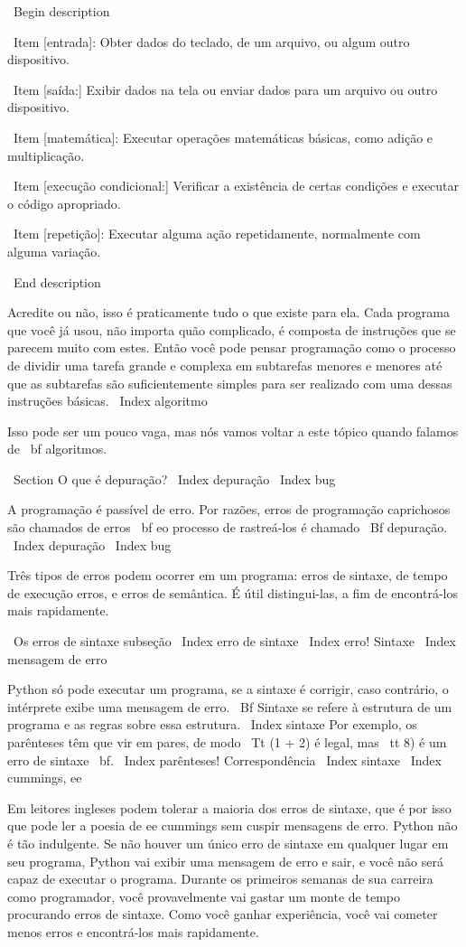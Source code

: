 \documentclass[10pt]{book}
\begin{document}
{\ Begin {description}

\ Item [entrada]: Obter dados do teclado, de um arquivo, ou algum
outro dispositivo.

\ Item [saída:] Exibir dados na tela ou enviar dados para um
arquivo ou outro dispositivo.

\ Item [matemática]: Executar operações matemáticas básicas, como adição e
multiplicação.

\ Item [execução condicional:] Verificar a existência de certas condições e
executar o código apropriado.

\ Item [repetição]: Executar alguma ação repetidamente, normalmente com
alguma variação.

\ End {description}

Acredite ou não, isso é praticamente tudo o que existe para ela. Cada
programa que você já usou, não importa quão complicado, é composta de
instruções que se parecem muito com estes. Então você pode pensar
programação como o processo de dividir uma tarefa grande e complexa
em subtarefas menores e menores até que as subtarefas são
suficientemente simples para ser realizado com uma dessas instruções básicas.
\ Index {algoritmo}

Isso pode ser um pouco vaga, mas nós vamos voltar a este tópico
quando falamos de {\ bf algoritmos}.

\ Section {O que é depuração?}
\ Index {depuração}
\ Index {bug}

A programação é passível de erro. Por razões, erros de programação caprichosos
são chamados de erros {\ bf} eo processo de rastreá-los é chamado
{\ Bf depuração}.
\ Index {depuração}
\ Index {bug}

Três tipos de erros podem ocorrer em um programa: erros de sintaxe, de tempo de execução 
erros, e erros de semântica. É útil
distingui-las, a fim de encontrá-los mais rapidamente.

\ {Os erros de sintaxe} subseção
\ Index {erro de sintaxe}
\ Index {erro! Sintaxe}
\ Index {mensagem de erro}

Python só pode executar um programa, se a sintaxe é
corrigir, caso contrário, o intérprete exibe uma mensagem de erro.
{\ Bf} Sintaxe se refere à estrutura de um programa e as regras sobre
essa estrutura. \ Index {} sintaxe
Por exemplo, os parênteses têm que vir em pares, de modo
{\ Tt (1 + 2)} é legal, mas {\ tt 8)} é um erro de sintaxe {\ bf}.
\ Index {parênteses! Correspondência}
\ Index {} sintaxe
\ Index {cummings, ee}

Em leitores ingleses podem tolerar a maioria dos erros de sintaxe, que é por isso que
pode ler a poesia de ee cummings sem cuspir mensagens de erro.
Python não é tão indulgente. Se não houver um único erro de sintaxe
em qualquer lugar em seu programa, Python vai exibir uma mensagem de erro e sair,
e você não será capaz de executar o programa. Durante os primeiros
semanas de sua carreira como programador, você provavelmente vai gastar um monte de
tempo procurando erros de sintaxe. Como você ganhar experiência, você vai
cometer menos erros e encontrá-los mais rapidamente.

}
\end{document}
